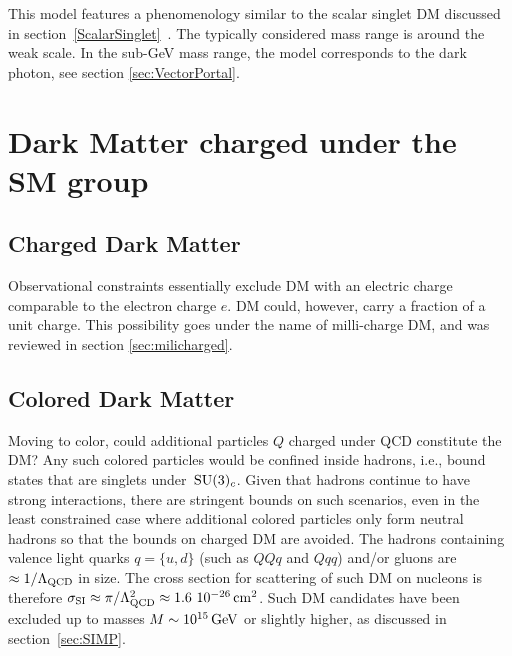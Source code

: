 This model features a phenomenology similar to the scalar singlet DM discussed in section~\ref{ScalarSinglet}~\cite{VectorSinglet}. 
The typically considered mass range is around the weak scale. In the sub-GeV mass range, the model corresponds to the dark photon, see section \ref{sec:VectorPortal}. 




\section{Dark Matter charged under the SM group}

\subsection{Charged Dark Matter}\label{sec:ChargedDM}
Observational constraints essentially exclude DM with an electric charge comparable to the electron charge $e$.
DM could, however, carry a fraction of a unit charge. This possibility goes under the name of milli-charge DM, and was reviewed in section \ref{sec:milicharged}.

\subsection{Colored Dark Matter}\label{sec:ColoredDM}
Moving to color,
could additional particles $Q$ charged under QCD constitute the DM? Any such colored particles would be confined inside hadrons, i.e., bound states that are singlets under $\,{\rm SU}(3)_c$. 
Given that hadrons continue to have strong interactions, there are stringent bounds on such scenarios, even in the least constrained case where additional colored particles only form neutral hadrons  so that the bounds on charged DM are avoided.
The hadrons containing valence light quarks $q=\{u,d\}$ (such as $QQ q$ and $Q qq$) and/or gluons are $\approx 1/\Lambda_{\rm QCD}$ in size. The cross section for scattering of such DM on nucleons is therefore $\sigma_{\rm SI} \approx \pi/\Lambda_{\rm QCD}^2 \approx 1.6~10^{-26}\,{\rm cm}^2$. 
Such DM candidates have been excluded up to masses $M \sim 10^{15}\,{\rm GeV}$ or slightly higher, as discussed in section~\ref{sec:SIMP}.


